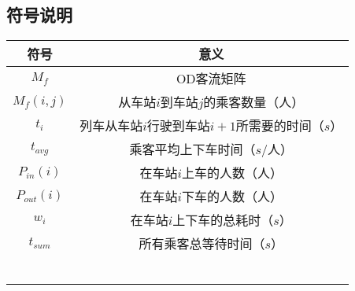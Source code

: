 \subsection{符号说明}

\begin{table}[h]
    \centering
    \begin{tabular}{@{}cc@{}}
    \toprule
    符号         & 意义                              \\ \midrule
    $M_f$       & OD客流矩阵                          \\
    $M_f(i,j)$  & 从车站$i$到车站$j$的乘客数量（人）            \\
    $t_i$       & 列车从车站$i$行驶到车站$i+1$所需要的时间（$s$） \\
    $t_{avg}$   & 乘客平均上下车时间（$s$/人）                  \\
    $P_{in}(i)$         &  在车站$i$上车的人数（人）    \\
    $P_{out}(i)$        & 在车站$i$下车的人数（人）   \\
    $w_i$       & 在车站$i$上下车的总耗时（$s$） \\
    $t_{sum}$   & 所有乘客总等待时间（$s$）     \\
                &                                 \\
                &                                 \\
                &                                 \\
                &                                 \\
                &                                 \\
                &                                 \\ \bottomrule
    \end{tabular}
\end{table}

